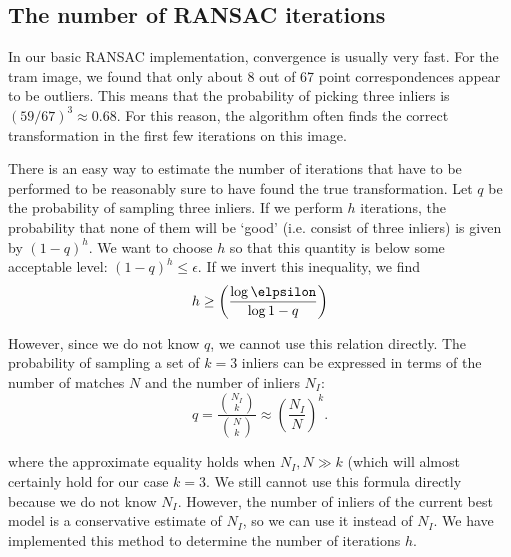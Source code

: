 \documentclass[a4paper,10pt]{article}
\begin{document}
\subsection{The number of RANSAC iterations}
In our basic RANSAC implementation, convergence is usually very fast.
For the tram image, we found that only about 8 out of 67 point correspondences appear to be outliers.
This means that the probability of picking three inliers is $(59/67)^3 \approx 0.68$.
For this reason, the algorithm often finds the correct transformation in the first few iterations on this image.

There is an easy way to estimate the number of iterations that have to be performed to be reasonably sure to have found the true transformation.
Let $q$ be the probability of sampling three inliers.
If we perform $h$ iterations, the probability that none of them will be `good' (i.e. consist of three inliers) is given by $(1-q)^h$.
We want to choose $h$ so that this quantity is below some acceptable level: $(1-q)^h \leq \epsilon$.
If we invert this inequality, we find
\begin{equation}
h \geq \left( \frac{\log \elpsilon}{\log{1-q}} \right)
\end{equation}

However, since we do not know $q$, we cannot use this relation directly.
The probability of sampling a set of $k=3$ inliers can be expressed in terms of the number of matches $N$ and the number of inliers $N_I$:
\begin{equation}
q = \frac{\binom{N_I}{k}}{\binom{N}{k}} \approx \left(\frac{N_I}{N}\right)^k.
\end{equation}

where the approximate equality holds when $N_I,N \gg k$ (which will almost certainly hold for our case $k=3$.
We still cannot use this formula directly because we do not know $N_I$.
However, the number of inliers of the current best model is a conservative estimate of $N_I$, so we can use it instead of $N_I$.
We have implemented this method to determine the number of iterations $h$.

\end{document}
